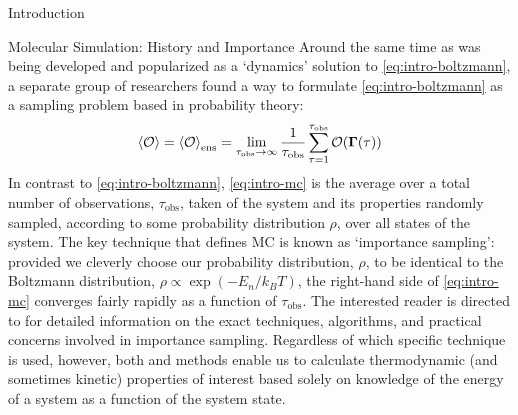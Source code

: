 \begin{chapter}{Introduction}
\begin{section}{Molecular Simulation: History and Importance}
Around the same time as \md was being developed and popularized as a `dynamics' solution to
\cref{eq:intro-boltzmann}, a separate group of
researchers\cite{Metropolis1953} found a way to
formulate \cref{eq:intro-boltzmann} as a sampling problem based in probability
theory: 
\cite{Harrison2010,allen1989computer}
%
\begin{align}
\label{eq:intro-mc}
\braket{\mathcal{O}} = \braket{\mathcal{O}}_{\text{ens}} 
= \lim_{\tau_{\text{obs}} \to \infty} \frac{1}{\tau_{\text{obs}}}
\sum\limits_{\tau = 1}^{\tau_{\text{obs}}}
\mathcal{O}(\bm{\Gamma}(\tau))
\end{align}
%
In contrast to \cref{eq:intro-boltzmann}, \cref{eq:intro-mc} is the average
over a total number of observations, ${\tau_{\text{obs}}}$, taken of the
system and its properties randomly sampled, according to some probability
distribution $\rho$, over all states of the system.  The key technique that
defines MC is known as `importance sampling': provided we cleverly choose our
probability distribution, $\rho$, to be identical to the Boltzmann
distribution, $\rho \propto \exp (-E_n/k_BT)$, the right-hand side of
\cref{eq:intro-mc} converges fairly rapidly as a function of
${\tau_{\text{obs}}}$.  The interested reader is directed to
\citet{allen1989computer} for detailed information
on the exact techniques, algorithms, and practical concerns involved in
importance sampling.  
%
Regardless of which specific technique is used, however, both
\md and \mc methods
enable us to calculate thermodynamic (and sometimes kinetic) properties of
interest based solely on knowledge of the energy of a system as a function of
the system state.





\end{section}
\end{chapter}
